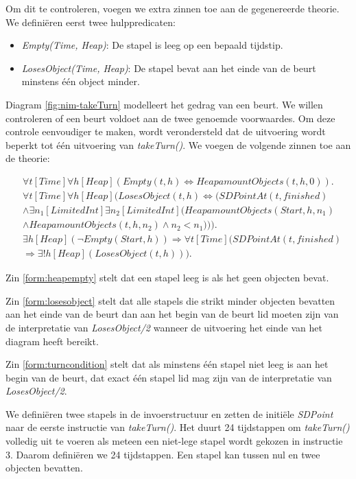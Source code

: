 Om dit te controleren, voegen we extra zinnen toe aan de gegenereerde theorie. We defini\"eren eerst twee hulppredicaten:

\begin{itemize}
	\item \textit{Empty(Time, Heap)}: De stapel is leeg op een bepaald tijdstip.
	\item \textit{LosesObject(Time, Heap)}: De stapel bevat aan het einde van de beurt minstens \'e\'en object minder.
\end{itemize}

Diagram \ref{fig:nim-takeTurn} modelleert het gedrag van een beurt. We willen controleren of een beurt voldoet aan de twee genoemde voorwaardes. Om deze controle eenvoudiger te maken, wordt verondersteld dat de uitvoering wordt beperkt tot \'e\'en uitvoering van \textit{takeTurn()}.
We voegen de volgende zinnen toe aan de theorie:

\begin{align}
	&\forall{t}[Time]\forall{h}[Heap](Empty(t, h) \Leftrightarrow HeapamountObjects(t, h, 0)).\label{form:heapempty} \\
	&\nonumber \forall{t}[Time]\forall{h}[Heap](LosesObject(t, h) \Leftrightarrow (SDPointAt(t, finished) \\ &\nonumber \land \exists{n_1}[LimitedInt]\exists{n_2}[LimitedInt](HeapamountObjects(Start, h, n_1) \\ &\land HeapamountObjects(t, h, n_2) \land n_2 < n_1))).\label{form:losesobject} \\
	&\nonumber \exists{h}[Heap](\lnot{}Empty(Start, h)) \Rightarrow \forall{t}[Time](SDPointAt(t, finished) \\ &\Rightarrow \exists!{h}[Heap](LosesObject(t, h)))\label{form:turncondition}.
\end{align}

Zin \ref{form:heapempty} stelt dat een stapel leeg is als het geen objecten bevat.

Zin \ref{form:losesobject} stelt dat alle stapels die strikt minder objecten bevatten aan het einde van de beurt dan aan het begin van de beurt lid moeten zijn van de interpretatie van \textit{LosesObject/2} wanneer de uitvoering het einde van het diagram heeft bereikt.

Zin \ref{form:turncondition} stelt dat als minstens \'e\'en stapel niet leeg is aan het begin van de beurt, dat exact \'e\'en stapel lid mag zijn van de interpretatie van \textit{LosesObject/2}.

We defini\"eren twee stapels in de invoerstructuur en zetten de initi\"ele \textit{SDPoint} naar de eerste instructie van \textit{takeTurn()}. Het duurt 24 tijdstappen om \textit{takeTurn()} volledig uit te voeren als meteen een niet-lege stapel wordt gekozen in instructie 3. Daarom defini\"eren we 24 tijdstappen. Een stapel kan tussen nul en twee objecten bevatten.

